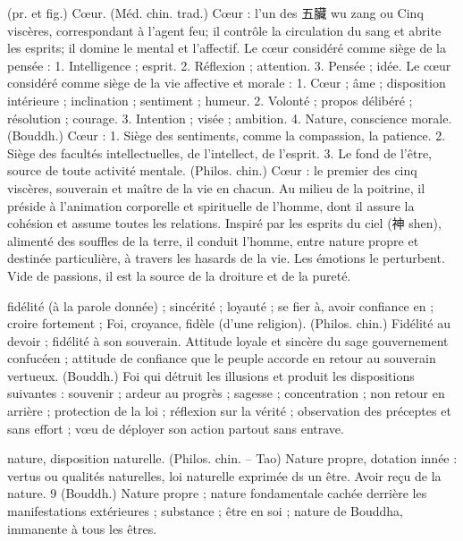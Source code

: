 \begin{Def}[xin 心]
    (pr. et fig.) Cœur.	    (Méd. chin. trad.) Cœur : l’un des 五臟 wu zang ou Cinq viscères, correspondant à l’agent feu; il contrôle la circulation du sang et abrite les esprits; il domine le mental et l’affectif. Le cœur considéré comme siège de la pensée : 1. Intelligence ; esprit. 2. Réflexion ; attention. 3. Pensée ; idée. Le cœur considéré comme siège de la vie affective et morale : 1. Cœur ; âme ; disposition intérieure ; inclination ; sentiment ; humeur. 2. Volonté ; propos délibéré ; résolution ; courage. 3. Intention ; visée ; ambition. 4. Nature, conscience morale. (Bouddh.) Cœur : 1. Siège des sentiments, comme la compassion, la patience. 2. Siège des facultés intellectuelles, de l’intellect, de l’esprit. 3. Le fond de l’être, source de toute activité mentale.  (Philos. chin.) Cœur : le premier des cinq viscères, souverain et maître de la vie en chacun. Au milieu de la poitrine, il préside à l’animation corporelle et spirituelle de l’homme, dont il assure la cohésion et assume toutes les relations. Inspiré par les esprits du ciel (神 shen), alimenté des souffles de la terre, il conduit l’homme, entre nature propre et destinée particulière, à travers les hasards de la vie. Les émotions le perturbent. Vide de passions, il est la source de la droiture et de la pureté.
\end{Def}
\begin{Def}[xin信]
   fidélité (à la parole donnée) ; sincérité ; loyauté ; se fier à, avoir confiance en ; croire fortement ; Foi, croyance, fidèle (d’une religion).     (Philos. chin.) Fidélité au devoir ; fidélité à son souverain. Attitude loyale et sincère du sage gouvernement confucéen ; attitude de confiance que le peuple accorde en retour au souverain vertueux.     (Bouddh.) Foi qui détruit les illusions et produit les dispositions suivantes : souvenir ; ardeur au progrès ; sagesse ; concentration ; non retour en arrière ; protection de la loi ; réflexion sur la vérité ; observation des préceptes et sans effort ; vœu de déployer son action partout sans entrave. 
\end{Def}
\begin{Def}[xing 性 ]
    nature, disposition naturelle.     (Philos. chin. – Tao) Nature propre, dotation innée : vertus ou qualités naturelles, loi naturelle exprimée ds un être. Avoir reçu de la nature.  9     (Bouddh.) Nature propre ; nature fondamentale cachée derrière les manifestations extérieures ; substance ; être en soi ; nature de Bouddha, immanente à tous les êtres. 
\end{Def}
